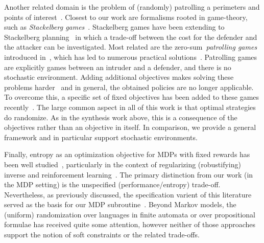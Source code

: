 Another related domain is the problem of (randomly) patrolling a perimeters and
points of interest~\cite{DBLP:conf/icra/AgmonKK08,DBLP:conf/icra/AmigoniBG09,DBLP:conf/iros/PortugalPRC14}.
Closest to our work are  formalisms rooted in game-theory,  such as  \emph{Stackelberg games}~\cite{simaan1973stackelberg,DBLP:conf/atal/ParuchuriPTOK07}. Stackelberg games have been extending to Stackelberg planning~\cite{DBLP:conf/aaai/SpeicherS00K18} in which a trade-off between the cost for the defender and the attacker can be investigated.
Most related are the zero-sum~\emph{patrolling games} introduced in~\cite{DBLP:journals/ior/AlpernMP11}, which has led to numerous practical solutions~\cite{DBLP:books/daglib/0040483}. Patrolling games are explicitly games between an intruder and a defender, and there is no stochastic environment.  Adding additional objectives makes solving these problems harder~\cite{DBLP:conf/atal/Klaska0R20} and in general, the obtained policies are no longer applicable. To overcome this, a specific set of fixed objectives has been added to these games recently~\cite{DBLP:conf/atal/Klaska0R20}. 
 The large common aspect in all of this work is that optimal strategies do randomize. As in the synthesis work above, this is a consequence of the objectives rather than an objective in itself. 
 In comparison, we provide a general framework and in particular support stochastic environments.

Finally, entropy as an optimization objective for MDPs with fixed
rewards has been well studied~\cite{DBLP:journals/tac/SavasOCKT20},
particularly in the context of regularizing (robustifying) inverse and
reinforcement learning~\cite{mceThesis, DBLP:conf/icml/GeistSP19}. The
primary distinction from our work (in the MDP setting) is the
unspecified (performance/entropy) trade-off. Nevertheless, as
previously discussed, the specification varient of this literature
served as the basis for our MDP
subroutine~\cite{DBLP:conf/cav/Vazquez-Chanlatte20}.  Beyond Markov
models, the (uniform) randomization over languages in finite automata
\cite{DBLP:journals/siamcomp/HickeyC83,DBLP:conf/soda/KannanSM95} or
over propositional formulae
\cite{DBLP:journals/tcs/JerrumVV86,DBLP:journals/iandc/BellareGP00,DBLP:conf/dac/ChakrabortyMV14}
has received quite some attention, however neither of those approaches
support the notion of soft constraints or the related trade-offs.

 
